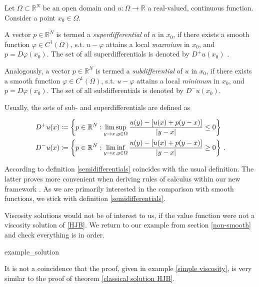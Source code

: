 	\begin{definition}
		\label{semidifferentials}
		Let $ \Omega \subset \mathbb{R}^N $ be an open domain and $ u : \Omega \to \mathbb{R} $ a real-valued, continuous function. Consider a point $ x_0 \in \Omega $. 
		
		A vector $ p \in \mathbb{R}^N $ is termed a \emph{superdifferential} of $ u $ in $ x_0 $, if there exists a smooth function $ \varphi \in C^{1}(\Omega) $, s.t. $ u - \varphi $ attains a local \emph{maxmium} in $ x_0 $, and $ p = D \varphi(x_0) $. The set of all superdifferentials is denoted by $ D^{+}u(x_0) $ .
		
		Analogously, a vector $ p \in \mathbb{R}^N $ is termed a \emph{subdifferential} of $ u $ in $ x_0 $, if there exists a smooth function $ \varphi \in C^{1}(\Omega) $, s.t. $ u - \varphi $ attains a local \emph{minimum} in $ x_0 $, and $ p = D \varphi(x_0) $. The set of all subdifferentials is denoted by $ D^{-}u(x_0) $.
	\end{definition}

	\begin{remark}
		Usually, the sets of sub- and superdifferentials are defined as
		
		\begin{align*}
			D^{+} u(x) &\coloneqq \bigg\{p \in \mathbb{R}^N : \limsup\limits_{y \to x, y \in \Omega} \frac{u(y) - \left[u(x) + p(y - x) \right]}{\left\lvert {y - x} \right\rvert} \leq 0 \bigg\} \\
			D^{-} u(x) &\coloneqq \bigg\{p \in \mathbb{R}^N : \liminf\limits_{y \to x, y \in \Omega} \frac{u(y) - \left[u(x) + p(y - x) \right]}{\left\lvert {y - x} \right\rvert} \geq 0 \bigg\} \ .
		\end{align*}
		
		According to \cite[lemma 1.7, p.~29]{bardi2008optimal} definition \ref{semidifferentials} coincides with the usual definition. The latter proves more convenient when deriving rules of calculus within our new framework \cite[cf. p.~37 et sqq]{bardi2008optimal}. As we are primarily interested in the comparison with smooth functions, we stick with definition \ref{semidifferentials}.
	\end{remark}

	Viscosity solutions would not be of interest to us, if the value function were not a viscosity solution of \eqref{HJB}. We return to our example from section \ref{non-smooth} and check everything is in order.
	
	{example_solution}
	
	It is not a coincidence that the proof, given in example \ref{simple viscosity}, is very similar to the proof of theorem \ref{classical solution HJB}.
	
